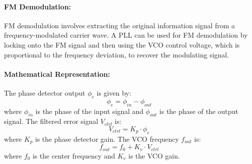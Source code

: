 \paragraph{FM Demodulation:}
FM demodulation involves extracting the original information signal from a frequency-modulated carrier wave. A PLL can be used for FM demodulation by locking onto the FM signal and then using the VCO control voltage, which is proportional to the frequency deviation, to recover the modulating signal.

\paragraph{Mathematical Representation:}
The phase detector output \( \phi_e \) is given by:
\[
\phi_e = \phi_{in} - \phi_{out}
\]
where \( \phi_{in} \) is the phase of the input signal and \( \phi_{out} \) is the phase of the output signal. The filtered error signal \( V_{ctrl} \) is:
\[
V_{ctrl} = K_p \cdot \phi_e
\]
where \( K_p \) is the phase detector gain. The VCO frequency \( f_{out} \) is:
\[
f_{out} = f_0 + K_v \cdot V_{ctrl}
\]
where \( f_0 \) is the center frequency and \( K_v \) is the VCO gain.

